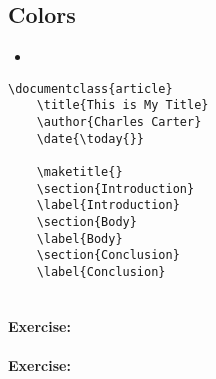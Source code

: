         \subsection{Colors}
        \label{Colors}
        
        \begin{framed}
            \begin{itemize}
                \item{}
            \end{itemize}
        \end{framed}


        \begin{verbatim}
\documentclass{article}
    \title{This is My Title}
    \author{Charles Carter}
    \date{\today{}}
 
    \maketitle{}
    \section{Introduction}
    \label{Introduction}
    \section{Body}
    \label{Body}
    \section{Conclusion}
    \label{Conclusion}
    
        \end{verbatim}

        \paragraph{Exercise:}

        \paragraph{Exercise:}


